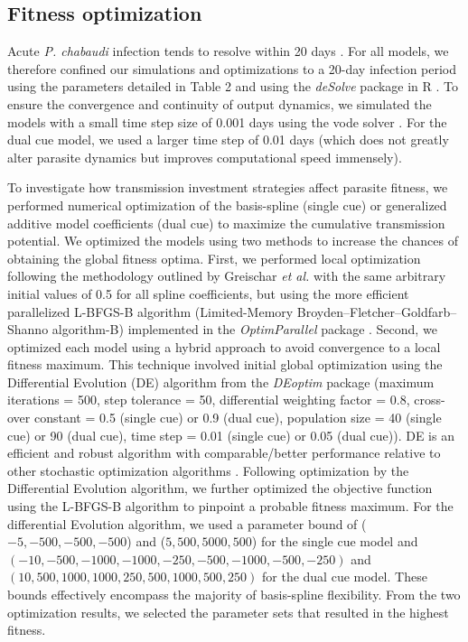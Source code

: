 \documentclass[10pt,letterpaper]{article}
\begin{document}
\subsection*{Fitness optimization}
Acute \emph{P. chabaudi} infection tends to resolve within 20 days \cite{stephens_contribution_2012}. For all models, we therefore confined our simulations and optimizations to a 20-day infection period using the parameters detailed in Table 2 and using the \emph{deSolve} package in R \cite{soetaert_solving_2020}. To ensure the convergence and continuity of output dynamics, we simulated the models with a small time step size of 0.001 days using the vode solver \cite{brown_vode_2006}. For the dual cue model, we used a larger time step of 0.01 days (which does not greatly alter parasite dynamics but improves computational speed immensely).\newline

To investigate how transmission investment strategies affect parasite fitness, we performed numerical optimization of the basis-spline (single cue) or generalized additive model coefficients (dual cue) to maximize the cumulative transmission potential. We optimized the models using two methods to increase the chances of obtaining the global fitness optima. First, we performed local optimization following the methodology outlined by Greischar \emph{et al.} \cite{greischar_predicting_2016} with the same arbitrary initial values of 0.5 for all spline coefficients, but using the more efficient parallelized L-BFGS-B algorithm (Limited-Memory Broyden–Fletcher–Goldfarb–Shanno algorithm-B) implemented in the \emph{OptimParallel} package \cite{gerber_optimparallel_2019}. Second, we optimized each model using a hybrid approach to avoid convergence to a local fitness maximum. This technique involved initial global optimization using the Differential Evolution (DE) algorithm from the \emph{DEoptim} package \cite{mullen_deoptim_2011} (maximum iterations = 500, step tolerance = 50, differential weighting factor = 0.8, cross-over constant = 0.5 (single cue) or 0.9 (dual cue), population size = 40 (single cue) or 90 (dual cue), time step = 0.01 (single cue) or 0.05 (dual cue)). DE is an efficient and robust algorithm with comparable/better performance relative to other stochastic optimization algorithms \cite{lampinen_differential_2004}. Following optimization by the Differential Evolution algorithm, we further optimized the objective function using the L-BFGS-B algorithm to pinpoint a probable fitness maximum. For the differential Evolution algorithm, we used a parameter bound of  (\(-5, -500, -500, -500\)) and (\(5, 500, 5000, 500\)) for the single cue model and $(-10, -500, -1000, -1000, -250, -500, -1000, -500, -250)$ and $(10, 500, 1000, 1000, 250, 500, 1000, 500, 250)$ for the dual cue model. These bounds effectively encompass the majority of basis-spline flexibility. From the two optimization results, we selected the parameter sets that resulted in the highest fitness. \newline
\end{document}
